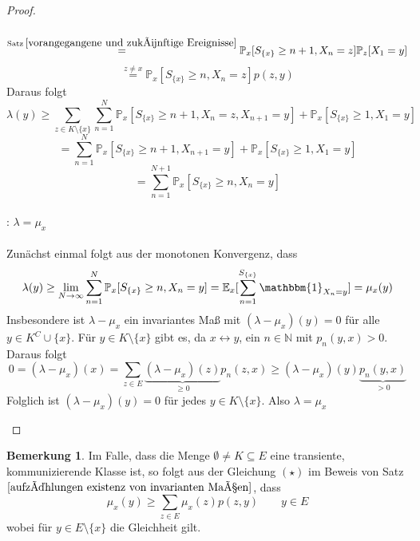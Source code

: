 \documentclass[a4paper,12pt]{scrartcl}
\theoremstyle{definition}
\newtheorem{bem}{Bemerkung}[section]
\begin{document}
\begin{proof}
\begin{itemize}
\begin{equation*}
\end{equation*}
\begin{equation*}
\stackrel{\mathrm{Satz} \:\ref{vorangegangene und zukünftige Ereignisse}}{=} \mathbb{P}_{x}[S_{\lbrace x \rbrace} \geq n+1, X_{n} = z] \mathbb{P}_{z}[ X_{1} = y]
\end{equation*}
\begin{equation*}
\stackrel{z \neq x}{=} \mathbb{P}_{x}[S_{\lbrace x \rbrace} \geq n, X_{n} = z]p(z,y)
\end{equation*}
Daraus folgt
\begin{equation*}
\lambda(y) \geq \sum_{z \in K \setminus \lbrace x \rbrace} \sum_{n=1}^{N} \mathbb{P}_{x}[S_{\lbrace x \rbrace} \geq n+1, X_{n} = z, X_{n+1}=y] + \mathbb{P}_{x}[S_{\lbrace x \rbrace} \geq 1, X_{1} = y]
\end{equation*}
\begin{equation*}
=  \sum_{n=1}^{N} \mathbb{P}_{x}[S_{\lbrace x \rbrace} \geq n+1, X_{n+1}=y] + \mathbb{P}_{x}[S_{\lbrace x \rbrace} \geq 1, X_{1} = y]
\end{equation*}
\begin{equation*}
= \sum_{n=1}^{N+1} \mathbb{P}_{x}[S_{\lbrace x \rbrace} \geq n, X_{n}=y]
\end{equation*}
\\
: $\lambda = \mu_{x}$
\\
\\
Zunächst einmal folgt aus der monotonen Konvergenz, dass 
\begin{equation*}
\lambda(y) \geq \lim_{N \to \infty} \sum_{n=1}^{N} \mathbb{P}_{x}[S_{\lbrace x \rbrace} \geq n, X_{n}=y] = \mathbb{E}_{x}[\sum_{n=1}^{S_{\lbrace x \rbrace}}  \mathbbm{1}_{X_{n} = y}] = \mu_{x}(y)
\end{equation*}
Insbesondere ist $\lambda - \mu_{x}$ ein invariantes Maß mit $(\lambda - \mu_{x})(y)=0$ für alle $y \in K^{C} \cup \lbrace x \rbrace$.
Für $y \in K \setminus \lbrace x \rbrace$ gibt es, da $x \leftrightarrow y$, ein $n \in \mathbb{N}$ mit $p_{n}(y,x)>0$. Daraus folgt
\begin{equation*}
0 = (\lambda - \mu_{x})(x) = \sum_{z \in E} \underbrace{(\lambda - \mu_{x})(z)}_{\geq 0}p_{n}(z,x) \geq (\lambda - \mu_{x})(y)\underbrace{p_{n}(y,x)}_{>0}
\end{equation*}
Folglich ist $ (\lambda - \mu_{x})(y)=0$ für jedes $y \in K \setminus \lbrace x \rbrace$. Also $\lambda = \mu_{x}$ 
\end{itemize}
\end{proof}
\begin{bem}
Im Falle, dass die Menge $\emptyset \neq K \subseteq E$ eine transiente, kommunizierende Klasse ist, so folgt aus der Gleichung $(\star)$ im Beweis von Satz $\ref{aufzählungen existenz von invarianten Maßen}$, dass
\begin{equation*}
\mu_{x}(y) \geq \sum_{z \in E} \mu_{x}(z)p(z,y) \qquad y \in E
\end{equation*}
wobei für $y \in E \setminus \lbrace x \rbrace$ die Gleichheit gilt.
\end{bem}
\end{document}

